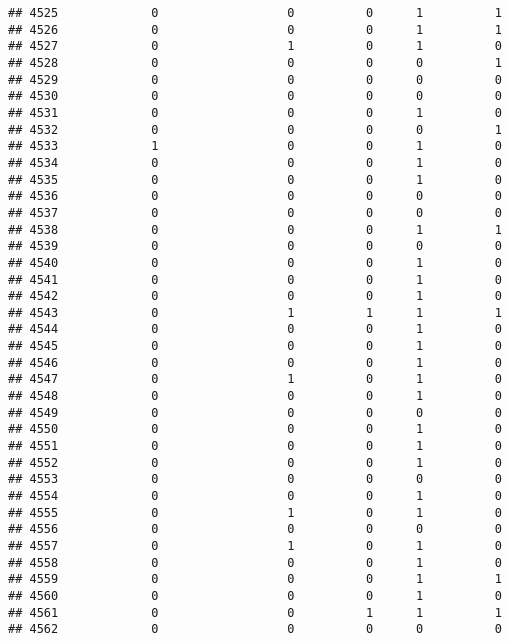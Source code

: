 \documentclass[
]{article}
\begin{document}
\begin{verbatim}
## 4525             0                  0          0      1          1
## 4526             0                  0          0      1          1
## 4527             0                  1          0      1          0
## 4528             0                  0          0      0          1
## 4529             0                  0          0      0          0
## 4530             0                  0          0      0          0
## 4531             0                  0          0      1          0
## 4532             0                  0          0      0          1
## 4533             1                  0          0      1          0
## 4534             0                  0          0      1          0
## 4535             0                  0          0      1          0
## 4536             0                  0          0      0          0
## 4537             0                  0          0      0          0
## 4538             0                  0          0      1          1
## 4539             0                  0          0      0          0
## 4540             0                  0          0      1          0
## 4541             0                  0          0      1          0
## 4542             0                  0          0      1          0
## 4543             0                  1          1      1          1
## 4544             0                  0          0      1          0
## 4545             0                  0          0      1          0
## 4546             0                  0          0      1          0
## 4547             0                  1          0      1          0
## 4548             0                  0          0      1          0
## 4549             0                  0          0      0          0
## 4550             0                  0          0      1          0
## 4551             0                  0          0      1          0
## 4552             0                  0          0      1          0
## 4553             0                  0          0      0          0
## 4554             0                  0          0      1          0
## 4555             0                  1          0      1          0
## 4556             0                  0          0      0          0
## 4557             0                  1          0      1          0
## 4558             0                  0          0      1          0
## 4559             0                  0          0      1          1
## 4560             0                  0          0      1          0
## 4561             0                  0          1      1          1
## 4562             0                  0          0      0          0

\end{verbatim}
\end{document}

